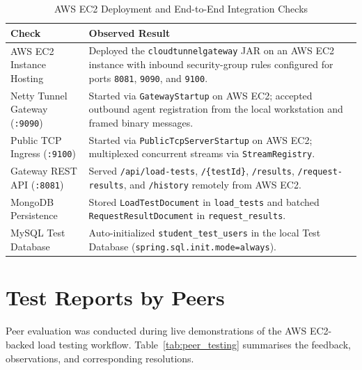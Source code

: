 \documentclass[11pt,a4paper]{report}
\begin{document}
\begin{table}[!htbp]
\centering
\small
\caption{AWS EC2 Deployment and End-to-End Integration Checks}
\label{tab:deploychecks}
\begin{tabularx}{\linewidth}{|L{3.7cm}|Y|}
\hline
\textbf{Check} & \textbf{Observed Result} \\
\hline
AWS EC2 Instance Hosting & Deployed the \texttt{cloudtunnelgateway} JAR on an AWS EC2 instance with inbound security-group rules configured for ports \texttt{8081}, \texttt{9090}, and \texttt{9100}. \\
\hline
Netty Tunnel Gateway (\texttt{:9090}) & Started via \texttt{GatewayStartup} on AWS EC2; accepted outbound agent registration from the local workstation and framed binary messages. \\
\hline
Public TCP Ingress (\texttt{:9100}) & Started via \texttt{PublicTcpServerStartup} on AWS EC2; multiplexed concurrent streams via \texttt{StreamRegistry}. \\
\hline
Gateway REST API (\texttt{:8081}) & Served \texttt{/api/load-tests}, \texttt{/\{testId\}}, \texttt{/results}, \texttt{/request-results}, and \texttt{/history} remotely from AWS EC2. \\
\hline
MongoDB Persistence & Stored \texttt{LoadTestDocument} in \texttt{load\_tests} and batched \texttt{RequestResultDocument} in \texttt{request\_results}. \\
\hline
MySQL Test Database & Auto-initialized \texttt{student\_test\_users} in the local Test Database (\texttt{spring.sql.init.mode=always}). \\
\hline
\end{tabularx}
\end{table}

\section{Test Reports by Peers}

Peer evaluation was conducted during live demonstrations of the AWS EC2-backed load testing workflow. Table~\ref{tab:peer_testing} summarises the feedback, observations, and corresponding resolutions.
\end{document}
